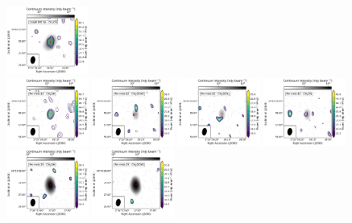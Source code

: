\begin{figure}[htbp!]
  \includegraphics[width=0.24\textwidth]{./moment0/Set1_ID01_2_CH3CN_257527.pdf}
  \\
  \includegraphics[width=0.24\textwidth]{./moment0/Set1_ID02_2_CH3OH_243915.pdf}
  \includegraphics[width=0.24\textwidth]{./moment0/Set1_ID02_2_CH3OCHO_259342.pdf}
  \includegraphics[width=0.24\textwidth]{./moment0/Set1_ID02_2_CH3OCH3_259311.pdf}
  \includegraphics[width=0.24\textwidth]{./moment0/Set1_ID02_2_CH3CN_257527.pdf}
  \\
  \includegraphics[width=0.24\textwidth]{./moment0/Set1_ID05_CH3OH_243915.pdf}
  \includegraphics[width=0.24\textwidth]{./moment0/Set1_ID05_CH3OCHO_259342.pdf}

\end{figure}
